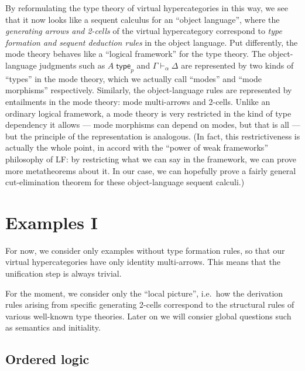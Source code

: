 \documentclass{article}
\theoremstyle{definition}
\theoremstyle{remark}
\def\type{\;\mathsf{type}}
\let\types\vdash
\begin{document}
By reformulating the type theory of virtual hypercategories in this way, we see that it now looks like a sequent calculus for an ``object language'', where the \emph{generating arrows and 2-cells} of the virtual hypercategory correspond to \emph{type formation and sequent deduction rules} in the object language.
Put differently, the mode theory behaves like a ``logical framework'' for the type theory.
The object-language judgments such as $A\type_p$ and $\Gamma\types_\alpha \Delta$ are represented by two kinds of ``types'' in the mode theory, which we actually call ``modes'' and ``mode morphisms'' respectively.
Similarly, the object-language rules are represented by entailments in the mode theory: mode multi-arrows and 2-cells.
Unlike an ordinary logical framework, a mode theory is very restricted in the kind of type dependency it allows --- mode morphisms can depend on modes, but that is all --- but the principle of the representation is analogous.
(In fact, this restrictiveness is actually the whole point, in accord with the ``power of weak frameworks'' philosophy of LF: by restricting what we can say in the framework, we can prove more metatheorems about it.
In our case, we can hopefully prove a fairly general cut-elimination theorem for these object-language sequent calculi.)


\section{Examples I}
\label{sec:examples1}

For now, we consider only examples without type formation rules, so that our virtual hypercategories have only identity multi-arrows.
This means that the unification step is always trivial.

For the moment, we consider only the ``local picture'', i.e.\ how the derivation rules arising from specific generating 2-cells correspond to the structural rules of various well-known type theories.
Later on we will consier global questions such as semantics and initiality.


\subsection{Ordered logic}
\label{sec:ordered-logic}
\end{document}

